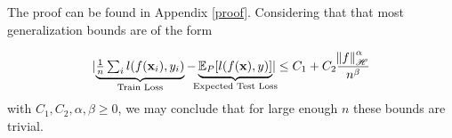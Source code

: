 





The proof can be found in Appendix \ref{proof}. Considering that that most generalization bounds are of the form

\begin{equation}
    \lvert \underbrace{\textstyle \frac{1}{n} \sum_i l(f(\mathbf{x}_i), y_i)}_{\mathclap{\text{Train Loss}}} - \underbrace{\textstyle \mathbb{E}_P[l(f(\mathbf{x}), y)]}_{\mathclap{\text{Expected Test Loss}}}  \rvert \leq C_1 + C_2 \frac{\norm{f}_\mathscr{H}^\alpha}{n^\beta}
\end{equation}
with $ C_1, C_2, \alpha, \beta \geq 0$, we may conclude that for large enough $n$ these bounds are trivial.






